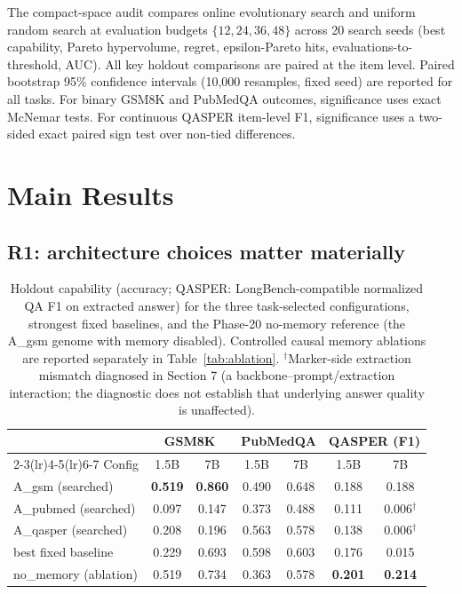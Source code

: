 \documentclass[11pt]{article}
\begin{document}
The compact-space audit compares online evolutionary search and uniform
random search at evaluation budgets $\{12, 24, 36, 48\}$ across 20 search
seeds (best capability, Pareto hypervolume, regret, epsilon-Pareto hits,
evaluations-to-threshold, AUC). All key holdout comparisons are paired at
the item level. Paired bootstrap 95\% confidence intervals (10{,}000
resamples, fixed seed) are reported for all tasks. For binary GSM8K and
PubMedQA outcomes, significance uses exact McNemar tests. For continuous
QASPER item-level F1, significance uses a two-sided exact paired sign test
over non-tied differences.

\section{Main Results}

\subsection{R1: architecture choices matter materially}

\begin{table}[t]
\centering\small
\begin{tabular}{@{}lcccccc@{}}
\toprule
 & \multicolumn{2}{c}{GSM8K} & \multicolumn{2}{c}{PubMedQA}
 & \multicolumn{2}{c}{QASPER (F1)} \\
\cmidrule(lr){2-3}\cmidrule(lr){4-5}\cmidrule(lr){6-7}
Config & 1.5B & 7B & 1.5B & 7B & 1.5B & 7B \\
\midrule
A\_gsm (searched) & \textbf{0.519} & \textbf{0.860} & 0.490 & 0.648 & 0.188 & 0.188 \\
A\_pubmed (searched) & 0.097 & 0.147 & 0.373 & 0.488 & 0.111 & 0.006$^\dagger$ \\
A\_qasper (searched) & 0.208 & 0.196 & 0.563 & 0.578 & 0.138 & 0.006$^\dagger$ \\
best fixed baseline & 0.229 & 0.693 & 0.598 & 0.603 & 0.176 & 0.015 \\
no\_memory (ablation) & 0.519 & 0.734 & 0.363 & 0.578 & \textbf{0.201} & \textbf{0.214} \\
\bottomrule
\end{tabular}
\caption{Holdout capability (accuracy; QASPER: LongBench-compatible
normalized QA F1 on extracted answer) for the three task-selected
configurations, strongest fixed baselines, and the Phase-20 no-memory
reference (the A\_gsm genome with memory disabled). Controlled causal memory
ablations are reported separately in Table~\ref{tab:ablation}.
$^\dagger$Marker-side extraction mismatch diagnosed in Section 7 (a
backbone--prompt/extraction interaction; the diagnostic does not establish
that underlying answer quality is unaffected).}
\label{tab:main}
\end{table}
\end{document}
